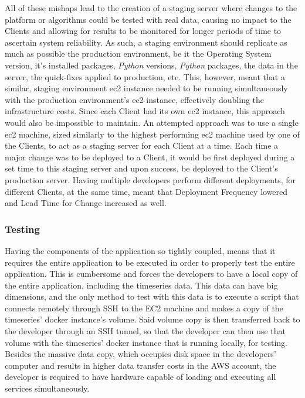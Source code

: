 All of these mishaps lead to the creation of a staging server where changes to the platform or algorithms could be tested with real data, causing no impact to the Clients and allowing for results to be monitored for longer periods of time to ascertain system reliability. As such, a staging environment should replicate as much as possible the production environment, be it the Operating System version, it's installed packages, \textit{Python} versions, \textit{Python} packages, the data in the server, the quick-fixes applied to production, etc.
This, however, meant that a similar, staging environment \gls{ec2} instance needed to be running simultaneously with the production environment's \gls{ec2} instance, effectively doubling the infrastructure costs. Since each Client had its own \gls{ec2} instance, this approach would also be impossible to maintain. An attempted approach was to use a single \gls{ec2} machine, sized similarly to the highest performing \gls{ec2} machine used by one of the Clients, to act as a staging server for each Client at a time. Each time a major change was to be deployed to a Client, it would be first deployed during a set time to this staging server and upon success, be deployed to the Client's production server. Having multiple developers perform different deployments, for different Clients, at the same time, meant that Deployment Frequency lowered and Lead Time for Change increased as well.

\subsubsection{Testing}\label{methodology:sss:testing}

Having the components of the application so tightly coupled, means that it requires the entire application to be executed in order to properly test the entire application. This is cumbersome and forces the developers to have a local copy of the entire application, including the timeseries data. This data can have big dimensions, and the only method to test with this data is to execute a script that connects remotely through SSH to the EC2 machine and makes a copy of the timeseries' docker instance's volume. Said volume copy is then transferred back to the developer through an SSH tunnel, so that the developer can then use that volume with the timeseries' docker instance that is running locally, for testing. Besides the massive data copy, which occupies disk space in the developers' computer and results in higher data transfer costs in the AWS account, the developer is required to have hardware capable of loading and executing all services simultaneously.

